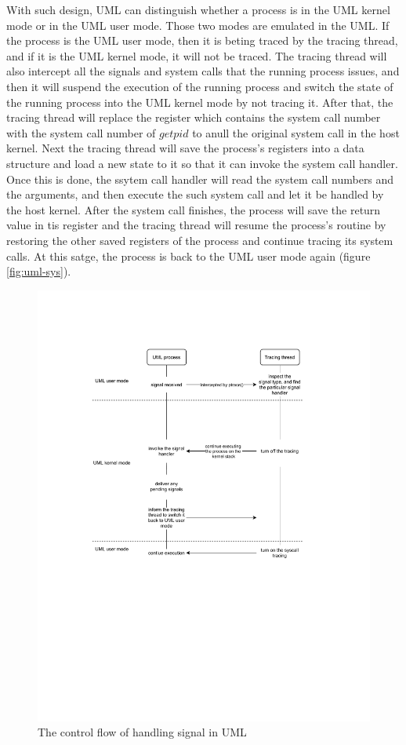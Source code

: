With such design, UML can distinguish whether a process is in the UML kernel mode or in the UML user mode. Those two modes are emulated in the UML. If the process is the UML user mode, then it is beting traced by the tracing thread, and if it is the UML kernel mode, it will not be traced. The tracing thread will also intercept all the signals and system calls that the running process issues, and then it will suspend the execution of the running process and switch the state of the running process into the UML kernel mode by not tracing it. After that, the tracing thread will replace the register which contains the system call number with the system call number of $getpid$ to anull the original system call in the host kernel. Next the tracing thread will save the process's registers into a data structure and load a new state to it so that it can invoke the system call handler. Once this is done, the ssytem call handler will read the system call numbers and the arguments, and then execute the such system call and let it be handled by the host kernel. After the system call finishes, the process will save the return value in tis register and the tracing thread will resume the process's routine by restoring the other saved registers of the process and continue tracing its system calls. At this satge, the process is back to the UML user mode again (figure \ref{fig:uml-sys}).

\begin{figure}[h]
    \centering
    \includegraphics[clip, trim=0cm 10cm 0cm 3cm, width=1.0\textwidth, height=1.0\textwidth]{ch2/UML-sig.pdf}
    \caption{The control flow of handling signal in UML}
    \label{fig:uml-sig}
\end{figure}

